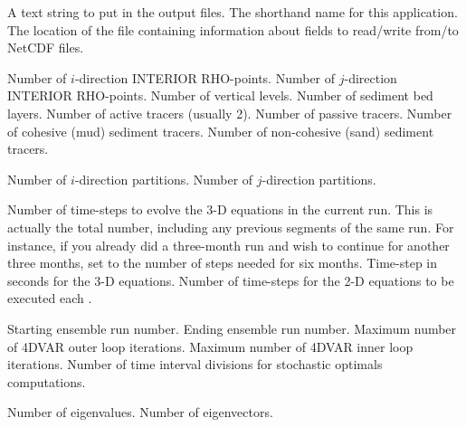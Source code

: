 \begin{klist}
    \mbox{}
     \begin{klist}
    A text string to put in the output files.
    The shorthand name for this application.
    The location of the  file
     containing information about fields to read/write from/to NetCDF
     files.
     \end{klist}
    \mbox{}
     \begin{klist}
        Number of $i$-direction INTERIOR RHO-points.
        Number of $j$-direction INTERIOR RHO-points.
        Number of vertical levels.
        Number of sediment bed layers.
        Number of active tracers (usually 2).
        Number of passive tracers.
        Number of cohesive (mud) sediment tracers.
        Number of non-cohesive (sand) sediment tracers.
     \end{klist}
    \mbox{}
     \begin{klist}
        Number of $i$-direction partitions.
        Number of $j$-direction partitions.
     \end{klist}
    \mbox{}
     \begin{klist}
           Number of time-steps to evolve the 3-D
       equations in the current run.  This is actually the total
     number, including any previous segments of the same run.  For
     instance, if you already did a three-month run and wish to
     continue for another three months, set  to the
     number of steps needed for six months.
               Time-step in seconds for the 3-D equations.
          Number of time-steps for the 2-D equations
     to be executed each .
     \end{klist}
    \mbox{}
     \begin{klist}
        Starting ensemble run number.
        Ending ensemble run number.
        Maximum number of 4DVAR outer loop iterations.
        Maximum number of 4DVAR inner loop iterations.
        Number of time interval divisions for
       stochastic optimals computations.
     \end{klist}
    \mbox{}
     \begin{klist}
        Number of eigenvalues.
        Number of eigenvectors.
     \end{klist}
    \mbox{}


\end{klist}
